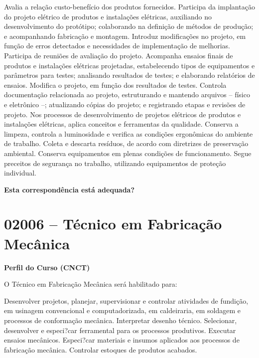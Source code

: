 \documentclass[
]{article}
\begin{document}
Avalia a relação custo-benefício dos produtos fornecidos. Participa da
implantação do projeto elétrico de produtos e instalações elétricas,
auxiliando no desenvolvimento do protótipo; colaborando na definição de
métodos de produção; e acompanhando fabricação e montagem. Introduz
modificações no projeto, em função de erros detectados e necessidades de
implementação de melhorias. Participa de reuniões de avaliação do
projeto. Acompanha ensaios finais de produtos e instalações elétricas
projetadas, estabelecendo tipos de equipamentos e parâmetros para
testes; analisando resultados de testes; e elaborando relatórios de
ensaios. Modifica o projeto, em função dos resultados de testes.
Controla documentação relacionada ao projeto, estruturando e mantendo
arquivos -- físico e eletrônico --; atualizando cópias do projeto; e
registrando etapas e revisões de projeto. Nos processos de
desenvolvimento de projetos elétricos de produtos e instalações
elétricas, aplica conceitos e ferramentas da qualidade. Conserva a
limpeza, controla a luminosidade e verifica as condições ergonômicas do
ambiente de trabalho. Coleta e descarta resíduos, de acordo com
diretrizes de preservação ambiental. Conserva equipamentos em plenas
condições de funcionamento. Segue preceitos de segurança no trabalho,
utilizando equipamentos de proteção individual.

\begin{Form}
\textbf{Esta correspondência está adequada?} \\ 
\end{Form}

\newpage
\section{ 02006 -- Técnico em Fabricação Mecânica }

\textbf{Perfil do Curso (CNCT)}

O Técnico em Fabricação Mecânica será habilitado para:

Desenvolver projetos, planejar, supervisionar e controlar atividades de
fundição, em usinagem convencional e computadorizada, em caldeiraria, em
soldagem e processos de conformação mecânica. Interpretar desenho
técnico. Selecionar, desenvolver e especi?car ferramental para os
processos produtivos. Executar ensaios mecânicos. Especi?car materiais e
insumos aplicados aos processos de fabricação mecânica. Controlar
estoques de produtos acabados.
\end{document}
